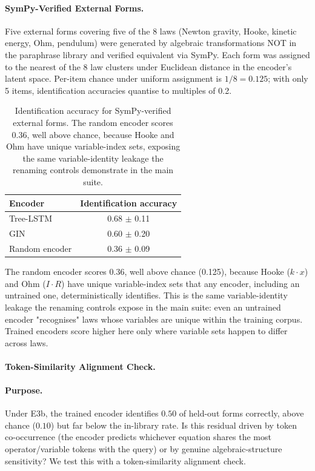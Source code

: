 \paragraph{SymPy-Verified External Forms.}
Five external forms covering five of the 8 laws (Newton gravity, Hooke, kinetic energy, Ohm, pendulum) were generated by algebraic transformations NOT in the paraphrase library and verified equivalent via SymPy. Each form was assigned to the nearest of the 8 law clusters under Euclidean distance in the encoder's latent space. Per-item chance under uniform assignment is $1/8 = 0.125$; with only 5 items, identification accuracies quantise to multiples of 0.2.

\begin{table}[h]
\centering
\caption{Identification accuracy for SymPy-verified external forms. The random encoder scores 0.36, well above chance, because Hooke and Ohm have unique variable-index sets, exposing the same variable-identity leakage the renaming controls demonstrate in the main suite.}
\label{tab:sympy}
\begin{tabular}{lc}
\toprule
Encoder & Identification accuracy \\
\midrule
Tree-LSTM & 0.68 $\pm$ 0.11 \\
GIN & 0.60 $\pm$ 0.20 \\
Random encoder & 0.36 $\pm$ 0.09 \\
\bottomrule
\end{tabular}
\end{table}

The random encoder scores 0.36, well above chance (0.125), because Hooke ($k \cdot x$) and Ohm ($I \cdot R$) have unique variable-index sets that any encoder, including an untrained one, deterministically identifies. This is the same variable-identity leakage the renaming controls expose in the main suite: even an untrained encoder "recognises" laws whose variables are unique within the training corpus. Trained encoders score higher here only where variable sets happen to differ across laws.


\paragraph{Token-Similarity Alignment Check.}
\label{app:family_scramble}

\paragraph{Purpose.} Under E3b, the trained encoder identifies $0.50$ of held-out forms correctly, above chance ($0.10$) but far below the in-library rate. Is this residual driven by token co-occurrence (the encoder predicts whichever equation shares the most operator/variable tokens with the query) or by genuine algebraic-structure sensitivity? We test this with a token-similarity alignment check.

